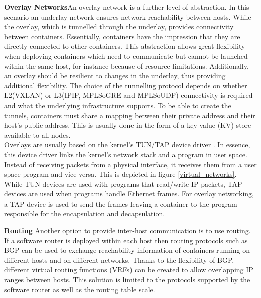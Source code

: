 \documentclass[conference]{IEEEtran}
\begin{document}
\noindent\textbf{Overlay Networks}\hspace{0.2cm}An overlay network is a further level of abstraction. In this scenario an underlay network ensures network reachability between hosts. While the overlay, which is tunnelled through the underlay, provides connectivity between containers. Essentially, containers have the impression that they are directly connected to other containers. This abstraction allows great flexibility when deploying containers which need to communicate but cannot be launched within the same host, for instance because of resource limitations. Additionally, an overlay should be resilient to changes in the underlay, thus providing additional flexibility. The choice of the tunnelling protocol depends on whether L2(VXLAN) or L3(IPIP, MPLSoGRE and MPLSoUDP) connectivity is required and what the underlying infrastructure supports. To be able to create the tunnels, containers must share a mapping between their private address and their host's public address. This is usually done in the form of a key-value (KV) store available to all nodes.\\
Overlays are usually based on the kernel's TUN/TAP device driver \cite{tuntap}. In essence, this device driver links the kernel's network stack and a program in user space. Instead of receiving packets from a physical interface, it receives them from a user space program and vice-versa. This is depicted in figure \ref{virtual_networks}. While TUN devices are used with programs that read/write IP packets, TAP devices are used when programs handle Ethernet frames. For overlay networking, a TAP device is used to send the frames leaving a container to the program responsible for the encapsulation and decapsulation.

\noindent\textbf{Routing}\hspace{0.2cm} Another option to provide inter-host communication is to use routing. If a software router is deployed within each host then routing protocols such as BGP can be used to exchange reachability information of containers running on different hosts and on different networks. Thanks to the flexibility of BGP, different virtual routing functions (VRFs) can be created to allow overlapping IP ranges between hosts. This solution is limited to the protocols supported by the software router as well as the routing table scale.
\end{document}
